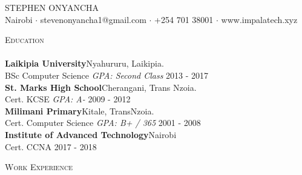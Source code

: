 \documentclass[a4paper]{article}
\newcommand{\lineunder} {
    \vspace*{-8pt} \\
    \hspace*{-18pt} \hrulefill \\
}
\newcommand{\header} [1] {
    {\hspace*{-18pt}\vspace*{6pt} \textsc{#1}}
    \vspace*{-6pt} \lineunder
}
\begin{document}
\vspace*{-40pt}

    

\vspace*{-10pt}
\begin{center}
	{\Huge \scshape {STEPHEN ONYANCHA}}\\
	Nairobi $\cdot$ stevenonyancha1@gmail.com $\cdot$ +254 701 38001 $\cdot$ www.impalatech.xyz\\
\end{center}

\header{Education}
\textbf{Laikipia University}\hfill Nyahururu, Laikipia.\\
BSc Computer Science \textit{GPA: Second Class} \hfill 2013 - 2017\\
\vspace{2mm}
\textbf{St. Mark\textquotesingle{}s High School}\hfill Cherangani, Trans Nzoia.\\
Cert. KCSE \textit{GPA: A-} \hfill 2009 - 2012\\
\vspace{2mm}
\textbf{Milimani Primary}\hfill Kitale, TransNzoia.\\
Cert. Computer Science \textit{GPA: B+ / 365} \hfill 2001 - 2008\\
\vspace{2mm}
\textbf{Institute of Advanced Technology}\hfill Nairobi\\
Cert. CCNA \hfill 2017 - 2018\\
\vspace{2mm}

\header{Work Experience}
\vspace{1mm}
\end{document}
